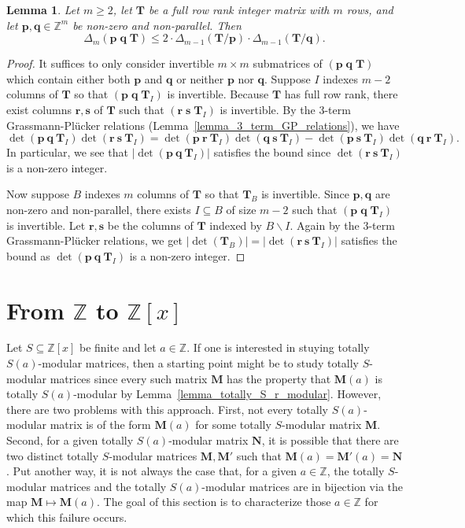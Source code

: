 \documentclass[a4paper, 11pt]{article}
\newcommand{\Z}{\mathbb{Z}}
\newcommand{\bp}{\bm{p}}
\newcommand{\bq}{\bm{q}}
\newcommand{\br}{\bm{r}}
\newcommand{\bs}{\bm{s}}
\newcommand{\bM}{\bm{M}}
\newcommand{\bN}{\bm{N}}
\newcommand{\bT}{\bm{T}}
\newcommand{\indet}{x}
\newcommand{\intvar}{a}
\newcommand{\polyring}{\Z[\indet]}
\newcommand{\polyS}{S}
\newtheorem{lemma}{Lemma}
\begin{document}
\begin{lemma}
\label{lemma_bound_subdeterminants_matrix_projection}
Let $m\geq 2$, let $\bT$ be a full row rank integer matrix with $m$ rows, and let $\bp,\bq\in\Z^m$ be non-zero and non-parallel. Then
\[
\Delta_m(\bp\;\bq\;\bT)\leq 2\cdot\Delta_{m-1}(\bT/\bp)\cdot\Delta_{m-1}(\bT/\bq).
\]

\end{lemma}
\begin{proof}
It suffices to only consider invertible $m\times m$ submatrices of $(\bp\;\bq\;\bT)$ which contain either both $\bp$ and $\bq$ or neither $\bp$ nor $\bq$. Suppose $I$ indexes $m-2$ columns of $\bT$ so that $(\bp\;\bq\;\bT_I)$ is invertible. Because $\bT$ has full row rank, there exist columns $\br,\bs$ of $\bT$ such that $(\br\;\bs\;\bT_I)$ is invertible. By the 3-term Grassmann-Pl\"ucker relations (Lemma~\ref{lemma_3_term_GP_relations}), we have
\[
\det(\bp\ \bq\ \bT_{I})\det(\br\ \bs\ \bT_{I})=\det(\bp\ \br\ \bT_{I})\det(\bq\ \bs\ \bT_{I})-\det(\bp\ \bs\ \bT_{I})\det(\bq\ \br\ \bT_{I}).
\]
In particular, we see that $\left|\det(\bp\ \bq\ \bT_{I})\right|$ satisfies the bound since $\det(\br\ \bs\ \bT_{I})$ is a non-zero integer.

Now suppose $B$ indexes $m$ columns of $\bT$ so that $\bT_B$ is invertible. Since $\bp,\bq$ are non-zero and non-parallel, there exists $I\subseteq B$ of size $m-2$ such that $(\bp\;\bq\;\bT_I)$ is invertible. Let $\br,\bs$ be the columns of $\bT$ indexed by $B\backslash I$. Again by the 3-term Grassmann-Pl\"ucker relations, we get $\left|\det(\bT_{B})\right|=\left|\det(\br\ \bs\ \bT_{I})\right|$ satisfies the bound as $\det(\bp\ \bq\ \bT_{I})$ is a non-zero integer.
\end{proof}

	\section{From $\Z$ to $\polyring$}
	\label{sec_bijection}
	Let $\polyS\subseteq \polyring$ be finite and let $\intvar\in\Z$. If one is interested in stuying totally $\polyS(\intvar)$-modular matrices, then a starting point might be to study totally $\polyS$-modular matrices since every such matrix $\bM$ has the property that $\bM(\intvar)$ is totally $\polyS(\intvar)$-modular by Lemma~\ref{lemma_totally_S_r_modular}. However, there are two problems with this approach. First, not every totally $\polyS(\intvar)$-modular matrix is of the form $\bM(\intvar)$ for some totally $\polyS$-modular matrix $\bM$. Second, for a given totally $\polyS(\intvar)$-modular matrix $\bN$, it is possible that there are two distinct totally $\polyS$-modular matrices $\bM,\bM'$ such that $\bM(\intvar)=\bM'(\intvar)=\bN$. Put another way, it is not always the case that, for a given $\intvar\in\Z$, the totally $\polyS$-modular matrices and the totally $\polyS(\intvar)$-modular matrices are in bijection via the map $\bM\mapsto\bM(\intvar)$. The goal of this section is to characterize those $\intvar\in\Z$ for which this failure occurs.
\end{document}
